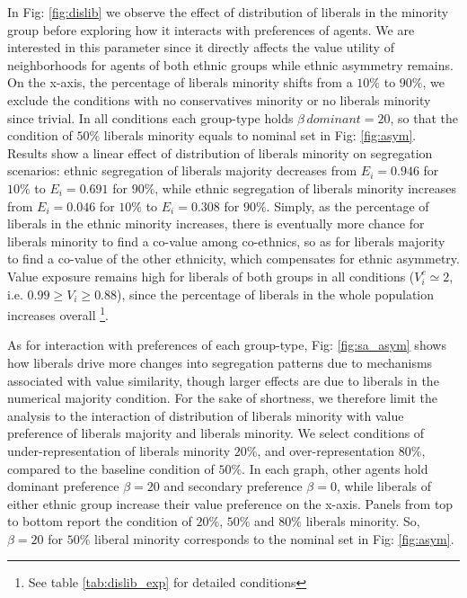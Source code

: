 \documentclass{article}
\begin{document}
In Fig: \ref{fig:dislib} we observe the effect of distribution of liberals in the minority group before exploring how it interacts with preferences of agents. We are interested in this parameter since it directly affects the value utility of neighborhoods for agents of both ethnic groups while ethnic asymmetry remains. On the x-axis, the percentage of liberals minority shifts from a $10 \%$ to $90 \%$, we exclude the conditions with no conservatives minority or no liberals minority since trivial.
In all conditions each group-type holds $\beta \, dominant = 20$, so that the condition of $50 \%$ liberals minority equals to nominal set in Fig: \ref{fig:asym}. Results show a linear effect of distribution of liberals minority on segregation scenarios: ethnic segregation of liberals majority decreases from $E_i = 0.946$ for $10 \%$ to $E_i = 0.691$ for $90 \%$, while ethnic segregation of liberals minority increases from $E_i = 0.046$ for $10 \%$ to $E_i = 0.308$ for $90 \%$. Simply, as the percentage of liberals in the ethnic minority increases, there is eventually more chance for liberals minority to find a co-value among co-ethnics, so as for liberals majority to find a co-value of the other ethnicity, which compensates for ethnic asymmetry. Value exposure remains high for liberals of both groups in all conditions ($V^c_i \simeq 2$, i.e. $0.99 \geq V_i \geq 0.88$), since the percentage of liberals in the whole population increases overall \footnote{See table \ref{tab:dislib_exp} for detailed conditions}.

As for interaction with preferences of each group-type, Fig: \ref{fig:sa_asym} shows how liberals drive more changes into segregation patterns due to mechanisms associated with value similarity, though larger effects are due to liberals in the numerical majority condition. For the sake of shortness, we therefore limit the analysis to the interaction of distribution of liberals minority with value preference of liberals majority and liberals minority. We select conditions of under-representation of liberals minority $20 \%$, and over-representation $80 \%$, compared to the baseline condition of $50 \%$. In each graph, other agents hold dominant preference $\beta = 20$ and secondary preference $\beta = 0$, while liberals of either ethnic group increase their value preference on the x-axis. Panels from top to bottom report the condition of $20 \%$, $50 \%$ and $80 \%$ liberals minority. So, $\beta = 20$ for $50 \%$ liberal minority corresponds to the nominal set in Fig: \ref{fig:asym}.
\end{document}

